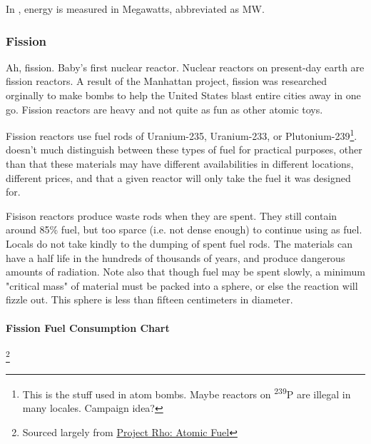 \par
In \getTitle , energy is measured in Megawatts, abbreviated as MW.

\subsubsection{Fission}

\par
Ah, fission. Baby's first nuclear reactor. Nuclear reactors on present-day earth are fission reactors. A result of the Manhattan project, fission was researched orginally to make bombs to help the United States blast entire cities away in one go. Fission reactors are heavy and not quite as fun as other atomic toys.

\par
Fission reactors use fuel rods of Uranium-235, Uranium-233, or Plutonium-239\footnote{This is the stuff used in atom bombs. Maybe reactors on \textsuperscript{239}P are illegal in many locales. Campaign idea?}. \getTitle\, doesn't much distinguish between these types of fuel for practical purposes, other than that these materials may have different availabilities in different locations, different prices, and that a given reactor will only take the fuel it was designed for.

\par
Fisison reactors produce waste rods when they are spent. They still contain around 85\% fuel, but too sparce (i.e. not dense enough) to continue using as fuel. Locals do not take kindly to the dumping of spent fuel rods. The materials can have a half life in the hundreds of thousands of years, and produce dangerous amounts of radiation. Note also that though fuel may be spent slowly, a minimum "critical mass" of material must be packed into a sphere, or else the reaction will fizzle out. This sphere is less than fifteen centimeters in diameter.

\paragraph{Fission Fuel Consumption Chart}\footnote{Sourced largely from \href{http://www.projectrho.com/public_html/rocket/atomicfuel.php}{Project Rho: Atomic Fuel}}
\paragraph{}

